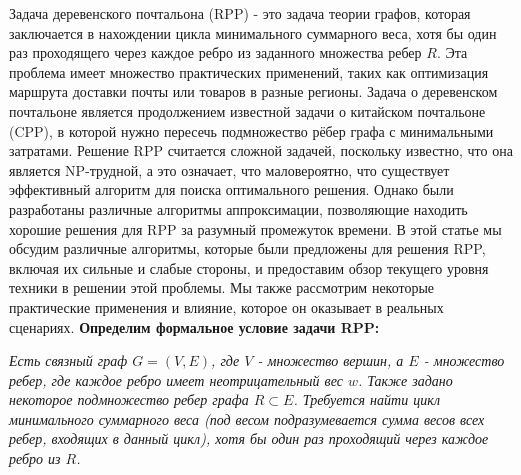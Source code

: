 Задача деревенского почтальона (RPP) - это задача теории графов, 
которая заключается в нахождении цикла минимального суммарного веса,
хотя бы один раз проходящего через каждое ребро из заданного множества ребер $R$. Эта проблема имеет множество практических применений, таких как оптимизация маршрута доставки почты или товаров в разные регионы.
\newline
\newline
Задача о деревенском почтальоне является продолжением известной задачи о китайском почтальоне (CPP), в которой нужно пересечь подмножество рёбер графа с минимальными затратами.
\newline
\newline
Решение RPP считается сложной задачей, поскольку известно, что она является NP-трудной, а это означает, что маловероятно, что существует эффективный алгоритм для поиска оптимального решения. Однако были разработаны различные алгоритмы аппроксимации, позволяющие находить хорошие решения для RPP за разумный промежуток времени.
\newline
\newline
В этой статье мы обсудим различные алгоритмы, которые были предложены для решения RPP, включая их сильные и слабые стороны, и предоставим обзор текущего уровня техники в решении этой проблемы. Мы также рассмотрим некоторые практические применения и влияние, которое он оказывает в реальных сценариях.
\newline
\newline
\textbf{Определим формальное условие задачи RPP:}

\textit{Есть связный граф $G = (V, E)$, где $V$ - множество вершин, а $E$ - множество ребер, где каждое ребро имеет неотрицательный вес $w$. 
Также задано некоторое подмножество ребер графа $R \subset E$.
Требуется найти цикл минимального суммарного веса (под весом подразумевается сумма весов всех ребер, входящих в данный цикл), хотя бы один раз проходящий через каждое ребро из $R$.}